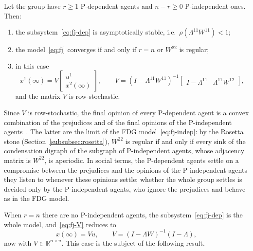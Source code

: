 \begin{theorem}
\label{thm:fj-general}
Let the group have $r \geq 1$ P-dependent agents and $n - r \geq 0$ P-independent
ones. Then:
\begin{enumerate}
  \item[(i)] the subsystem~\eqref{eq:fj-dep} is asymptotically stable, i.e.\
        $\rho(\Lambda^{11} W^{11}) < 1$;
  \item[(ii)] the model~\eqref{eq:fj} converges if and only if $r = n$ or $W^{22}$ is
        regular;
  \item[(iii)] in this case
        \begin{equation}\label{eq:fj-V}
          x^1(\infty) = V \begin{bmatrix} u^1 \\ x^2(\infty) \end{bmatrix}, \qquad
          V = (I - \Lambda^{11} W^{11})^{-1}
              \begin{bmatrix} I - \Lambda^{11} & \Lambda^{11} W^{12} \end{bmatrix},
        \end{equation}
        and the matrix $V$ is row-stochastic.
\end{enumerate}
\end{theorem}

Since $V$ is row-stochastic, the final opinion of every P-dependent agent is a convex
combination of the prejudices and of the final opinions of the P-independent
agents~\cite{proskurnikov2017tutorial}. The latter are the limit of the FDG
model~\eqref{eq:fj-indep}: by the Rosetta stone (Section~\ref{subsubsec:rosetta}),
$W^{22}$ is regular if and only if every sink of the condensation digraph of the
subgraph of P-independent agents, whose adjacency matrix is $W^{22}$, is aperiodic. In
social terms, the P-dependent agents settle on a compromise between the prejudices and
the opinions of the P-independent agents they listen to whenever these opinions
settle; whether the whole group settles is decided only by the P-independent agents,
who ignore the prejudices and behave as in the FDG model.

When $r = n$ there are no P-independent agents, the subsystem~\eqref{eq:fj-dep} is the
whole model, and~\eqref{eq:fj-V} reduces to
\begin{equation}\label{eq:fj-V-all}
  x(\infty) = V u, \qquad V = (I - \Lambda W)^{-1}(I - \Lambda),
\end{equation}
now with $V \in \mathbb{R}^{n \times n}$. This case is the subject of the following
result.


